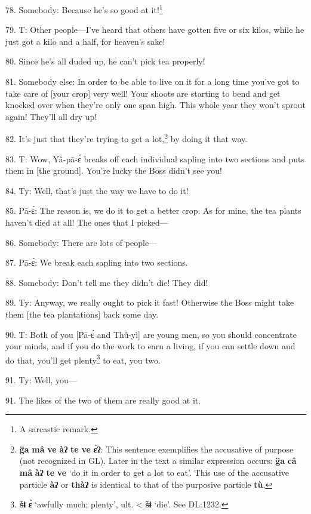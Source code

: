78. Somebody: Because he's so good at it!\footnote{A sarcastic remark.}

79. T: Other people---I've heard that others have gotten five or six kilos, while
he just got a kilo and a half, for heaven's sake!

80. Since he's all duded up, he can't pick tea properly!

81. Somebody else: In order to be able to live on it for a long time you've got
to take care of [your crop] very well! Your shoots are starting to bend and get
knocked over when they're only one span high. This whole year they won't sprout
again! They'll all dry up!

82. It's just that they're trying to get a lot,\footnote{\textbf{g̈a} \textbf{mâ} \textbf{ve} \textbf{àʔ} \textbf{te} \textbf{ve} \textbf{ɛ̀ʔ}: This sentence exemplifies the accusative of purpose (not recognized in GL). Later in the text a similar expression occurs: \textbf{g̈a} \textbf{câ} \textbf{mâ} \textbf{àʔ} \textbf{te} \textbf{ve} `do it in order to get a lot to eat'. This use of the accusative particle \textbf{àʔ} or \textbf{thàʔ} is identical to that of the purposive particle \textbf{tù}.} by doing it that way.

83. T: Wow, Yâ-pā-ɛ́ breaks off each individual sapling into two
sections and puts them in [the ground]. You're lucky the Boss didn't see you!

84. Ty: Well, that's just the way we have to do it!

85. Pā-ɛ́: The reason is, we do it to get a better crop. As for mine, the tea
plants haven't died at all! The ones that I picked---

86. Somebody: There are lots of people---

87. Pā-ɛ́: We break each sapling into two sections.

88. Somebody: Don't tell me they didn't die! They did!

89. Ty: Anyway, we really ought to pick it fast! Otherwise the Boss might take
them [the tea plantations] back some day.

90. T: Both of you [Pā-ɛ́ and Thû-yì] are young men, so you should concentrate
your minds, and if you do the work to earn a living, if you can settle down and
do that, you'll get plenty\footnote{\textbf{šɨ} \textbf{ɛ̀} `awfully much; plenty', ult. < \textbf{šɨ} `die'. See DL:1232.} to eat, you two.

91. Ty: Well, you---

91. The likes of the two of them are really good at it.

